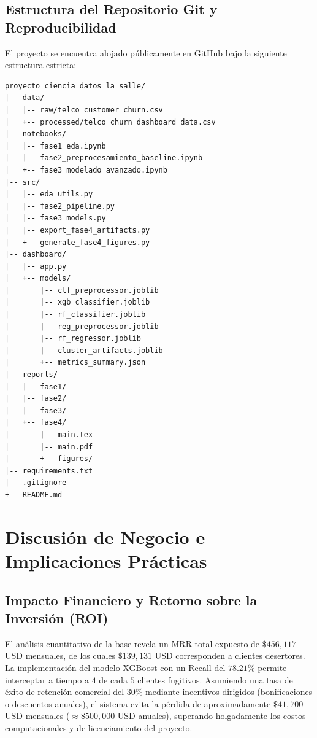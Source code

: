 \documentclass[11pt,letterpaper]{article}
\begin{document}
\subsection{Estructura del Repositorio Git y Reproducibilidad}
El proyecto se encuentra alojado públicamente en GitHub bajo la siguiente estructura estricta:
\begin{verbatim}
proyecto_ciencia_datos_la_salle/
|-- data/
|   |-- raw/telco_customer_churn.csv
|   +-- processed/telco_churn_dashboard_data.csv
|-- notebooks/
|   |-- fase1_eda.ipynb
|   |-- fase2_preprocesamiento_baseline.ipynb
|   +-- fase3_modelado_avanzado.ipynb
|-- src/
|   |-- eda_utils.py
|   |-- fase2_pipeline.py
|   |-- fase3_models.py
|   |-- export_fase4_artifacts.py
|   +-- generate_fase4_figures.py
|-- dashboard/
|   |-- app.py
|   +-- models/
|       |-- clf_preprocessor.joblib
|       |-- xgb_classifier.joblib
|       |-- rf_classifier.joblib
|       |-- reg_preprocessor.joblib
|       |-- rf_regressor.joblib
|       |-- cluster_artifacts.joblib
|       +-- metrics_summary.json
|-- reports/
|   |-- fase1/
|   |-- fase2/
|   |-- fase3/
|   +-- fase4/
|       |-- main.tex
|       |-- main.pdf
|       +-- figures/
|-- requirements.txt
|-- .gitignore
+-- README.md
\end{verbatim}

\section{Discusión de Negocio e Implicaciones Prácticas}

\subsection{Impacto Financiero y Retorno sobre la Inversión (ROI)}
El análisis cuantitativo de la base revela un MRR total expuesto de $\$456{,}117$ USD mensuales, de los cuales $\$139{,}131$ USD corresponden a clientes desertores. La implementación del modelo XGBoost con un Recall del $78.21\%$ permite interceptar a tiempo a $4$ de cada $5$ clientes fugitivos. Asumiendo una tasa de éxito de retención comercial del $30\%$ mediante incentivos dirigidos (bonificaciones o descuentos anuales), el sistema evita la pérdida de aproximadamente $\$41{,}700$ USD mensuales ($\approx \$500{,}000$ USD anuales), superando holgadamente los costos computacionales y de licenciamiento del proyecto.
\end{document}

